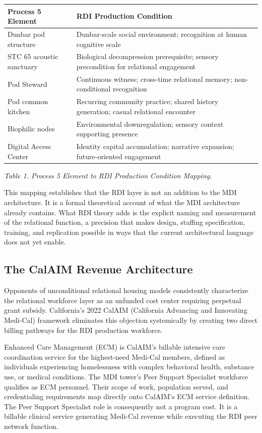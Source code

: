 \documentclass[12pt, letterpaper]{article}
\begin{document}
{\singlespacing
\begin{tabularx}{\textwidth}{@{}lX@{}}
\toprule
\rowcolor{rowgray}
Process 5 Element & RDI Production Condition \\
\midrule
Dunbar pod structure & Dunbar-scale social environment; recognition at human cognitive scale \\
\rowcolor{rowgray}
STC 65 acoustic sanctuary & Biological decompression prerequisite; sensory precondition for relational engagement \\
Pod Steward & Continuous witness; cross-time relational memory; non-conditional recognition \\
\rowcolor{rowgray}
Pod common kitchen & Recurring community practice; shared history generation; casual relational encounter \\
Biophilic nodes & Environmental downregulation; sensory context supporting presence \\
\rowcolor{rowgray}
Digital Access Center & Identity capital accumulation; narrative expansion; future-oriented engagement \\
\bottomrule
\end{tabularx}\par
\vspace{8pt}
\noindent\textit{Table 1. Process 5 Element to RDI Production Condition Mapping.}
\par}

This mapping establishes that the RDI layer is not an addition to the MDI architecture. It is a formal theoretical account of what the MDI architecture already contains. What RDI theory adds is the explicit naming and measurement of the relational function, a precision that makes design, staffing specification, training, and replication possible in ways that the current architectural language does not yet enable.

\subsection{The CalAIM Revenue Architecture}

Opponents of unconditional relational housing models consistently characterize the relational workforce layer as an unfunded cost center requiring perpetual grant subsidy. California's 2022 CalAIM (California Advancing and Innovating Medi-Cal) framework \citep{calaim_2022} eliminates this objection systemically by creating two direct billing pathways for the RDI production workforce.

Enhanced Care Management (ECM) is CalAIM's billable intensive care coordination service for the highest-need Medi-Cal members, defined as individuals experiencing homelessness with complex behavioral health, substance use, or medical conditions. The MDI tower's Peer Support Specialist workforce qualifies as ECM personnel. Their scope of work, population served, and credentialing requirements map directly onto CalAIM's ECM service definition. The Peer Support Specialist role is consequently not a program cost. It is a billable clinical service generating Medi-Cal revenue while executing the RDI peer network function.
\end{document}
